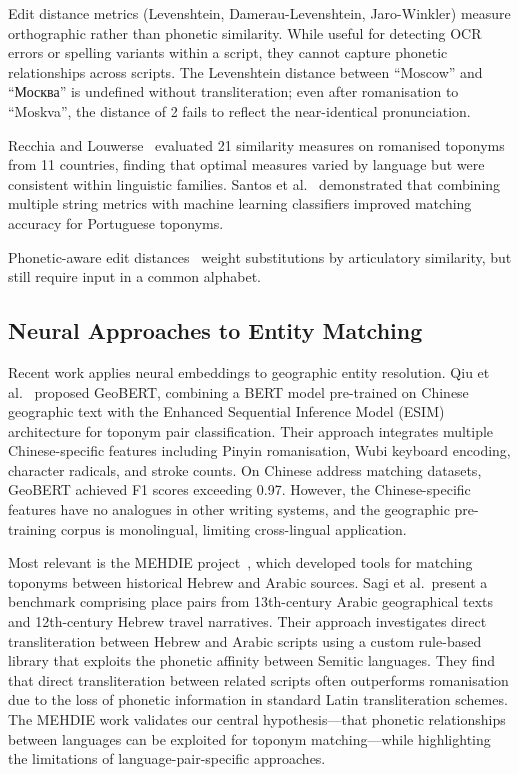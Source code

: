 \documentclass[11pt,a4paper]{article}
\begin{document}
Edit distance metrics (Levenshtein, Damerau-Levenshtein, Jaro-Winkler) measure orthographic rather than phonetic similarity. While useful for detecting OCR errors or spelling variants within a script, they cannot capture phonetic relationships across scripts. The Levenshtein distance between ``Moscow'' and ``Москва'' is undefined without transliteration; even after romanisation to ``Moskva'', the distance of 2 fails to reflect the near-identical pronunciation.

Recchia and Louwerse~\citep{recchia2013} evaluated 21 similarity measures on romanised toponyms from 11 countries, finding that optimal measures varied by language but were consistent within linguistic families. Santos et al.~\citep{santos2018} demonstrated that combining multiple string metrics with machine learning classifiers improved matching accuracy for Portuguese toponyms.

Phonetic-aware edit distances~\citep{kondrak2000} weight substitutions by articulatory similarity, but still require input in a common alphabet.

\subsection{Neural Approaches to Entity Matching}

Recent work applies neural embeddings to geographic entity resolution. Qiu et al.~\citep{qiu2024geobert} proposed GeoBERT, combining a BERT model pre-trained on Chinese geographic text with the Enhanced Sequential Inference Model (ESIM) architecture for toponym pair classification. Their approach integrates multiple Chinese-specific features including Pinyin romanisation, Wubi keyboard encoding, character radicals, and stroke counts. On Chinese address matching datasets, GeoBERT achieved F1 scores exceeding 0.97. However, the Chinese-specific features have no analogues in other writing systems, and the geographic pre-training corpus is monolingual, limiting cross-lingual application.

Most relevant is the MEHDIE project~\citep{mehdie2025}, which developed tools for matching toponyms between historical Hebrew and Arabic sources. Sagi et al.\ present a benchmark comprising place pairs from 13th-century Arabic geographical texts and 12th-century Hebrew travel narratives. Their approach investigates direct transliteration between Hebrew and Arabic scripts using a custom rule-based library that exploits the phonetic affinity between Semitic languages. They find that direct transliteration between related scripts often outperforms romanisation due to the loss of phonetic information in standard Latin transliteration schemes. The MEHDIE work validates our central hypothesis---that phonetic relationships between languages can be exploited for toponym matching---while highlighting the limitations of language-pair-specific approaches.
\end{document}
